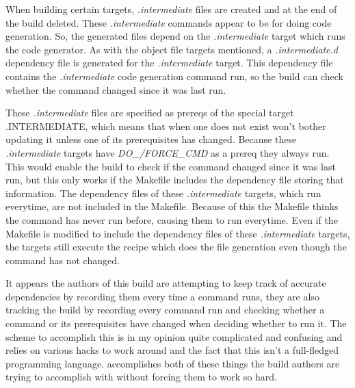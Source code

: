 



When building certain targets, \emph{.intermediate} files are created and at the end of the build deleted.  These \emph{.intermediate} commands appear to be for doing code generation.  So, the generated files depend on the \emph{.intermediate} target which runs the code generator.  As with the object file targets mentioned, a \emph{.intermediate.d} dependency file is generated for the \emph{.intermediate} target.  This dependency file contains the \emph{.intermediate} code generation command run, so the build can check whether the command changed since it was last run.

These \emph{.intermediate} files are specified as prereqs of the special \Make target {.INTERMEDIATE}, which means that when one does not exist \Make won't bother updating it unless one of its prerequisites has changed.  Because these \emph{.intermediate} targets have \emph{DO\_/FORCE\_CMD} as a prereq they always run.  This would enable the build to check if the command changed since it was last run, but this only works if the Makefile includes the dependency file storing that information.  The dependency files of these \emph{.intermediate} targets, which run everytime, are not included in the Makefile.  Because of this the Makefile thinks the command has never run before, causing them to run everytime.  Even if the Makefile is modified to include the dependency files of these \emph{.intermediate} targets, the targets still execute the recipe which does the file generation even though the command has not changed. %


It appears the authors of this build are attempting to keep track of accurate dependencies by recording them every time a command runs, they are also tracking the build by recording every command run and checking whether a command or its prerequisites have changed when deciding whether to run it.  The scheme to accomplish this is in my opinion quite complicated and confusing and relies on various hacks to work around \Make and the fact that this isn't a full-fledged programming language.  \Rattle accomplishes both of these things the build authors are trying to accomplish with \Make without forcing them to work so hard.

